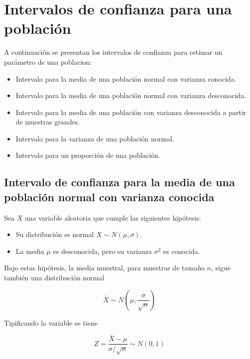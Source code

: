 \documentclass[
  a4paper,
]{scrreport}
\providecommand{\tightlist}{%
  \setlength{\itemsep}{0pt}\setlength{\parskip}{0pt}}\usepackage{longtable,booktabs,array}
\theoremstyle{definition}
\theoremstyle{definition}
\theoremstyle{plain}
\theoremstyle{remark}
\begin{document}
\hypertarget{intervalos-de-confianza-para-una-poblaciuxf3n}{%
\section{Intervalos de confianza para una
población}\label{intervalos-de-confianza-para-una-poblaciuxf3n}}

A continuación se presentan los intervalos de confianza para estimar un
parámetro de una poblacion:

\begin{itemize}
\tightlist
\item
  Intervalo para la media de una población normal con varianza conocida.
\item
  Intervalo para la media de una población normal con varianza
  desconocida.
\item
  Intervalo para la media de una población con varianza desconocida a
  partir de muestras grandes.
\item
  Intervalo para la varianza de una población normal.
\item
  Intervalo para un proporción de una población.
\end{itemize}

\hypertarget{intervalo-de-confianza-para-la-media-de-una-poblaciuxf3n-normal-con-varianza-conocida}{%
\subsection{Intervalo de confianza para la media de una población normal
con varianza
conocida}\label{intervalo-de-confianza-para-la-media-de-una-poblaciuxf3n-normal-con-varianza-conocida}}

Sea \(X\) una variable aleatoria que cumple las siguientes hipótesis:

\begin{itemize}
\tightlist
\item
  Su distribución es normal \(X\sim N(\mu,\sigma)\).
\item
  La media \(\mu\) es desconocida, pero su varianza \(\sigma^2\) es
  conocida.
\end{itemize}

Bajo estas hipótesis, la media muestral, para muestras de tamaño \(n\),
sigue también una distribución normal

\[
\bar X \sim N\left(\mu,\frac{\sigma}{\sqrt n}\right)
\]

Tipificando la variable se tiene

\[
Z=\frac{\bar X-\mu}{\sigma/\sqrt n} \sim N(0,1)
\]
\end{document}
